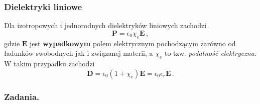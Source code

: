 \documentclass[../main.tex]{subfiles}
\begin{document}
\subsubsection*{Dielektryki liniowe}
Dla izotropowych i jednorodnych dielektryków liniowych zachodzi
\begin{equation*}
    \mathbf{P}=\epsilon_0\chi_e\mathbf{E}\,,
\end{equation*}
gdzie \(\mathbf{E}\) jest \textbf{wypadkowym} polem elektrycznym pochodzącym zarówno od ładunków swobodnych jak i związanej materii, a \(\chi_e\) to tzw. \textit{podatność elektryczna}. W takim przypadku zachodzi
\begin{equation*}
    \mathbf{D}=\epsilon_0(1+\chi_e)\mathbf{E}=\epsilon_0\epsilon_r\mathbf{E}\,.
\end{equation*}
\subsubsection*{Zadania.}
\end{document}

